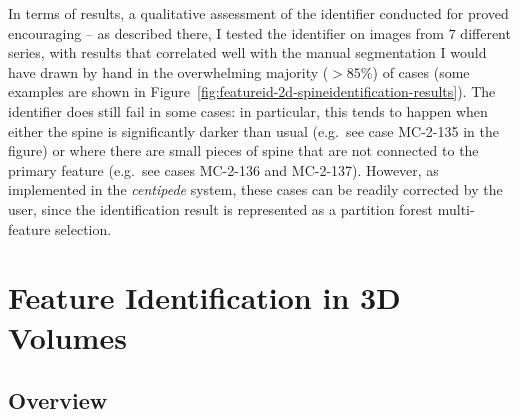In terms of results, a qualitative assessment of the identifier conducted for \cite{gvcispa09} proved encouraging -- as described there, I tested the identifier on images from $7$ different series, with results that correlated well with the manual segmentation I would have drawn by hand in the overwhelming majority ($> 85\%$) of cases (some examples are shown in Figure~\ref{fig:featureid-2d-spineidentification-results}). The identifier does still fail in some cases: in particular, this tends to happen when either the spine is significantly darker than usual (e.g.~see case MC-2-135 in the figure) or where there are small pieces of spine that are not connected to the primary feature (e.g.~see cases MC-2-136 and MC-2-137). However, as implemented in the \emph{centipede} system, these cases can be readily corrected by the user, since the identification result is represented as a partition forest multi-feature selection.


\begin{landscape}
\end{landscape}

\afterpage{\clearpage}
\newpage

\section{Feature Identification in 3D Volumes}

\subsection{Overview}

